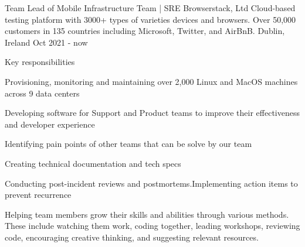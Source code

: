 

\begin{cventries}

    \cventry
    {Team Lead of Mobile Infrastructure Team | SRE} %
    {Browserstack, Ltd} %
    {Cloud-based testing platform with 3000+ types of varieties devices and browsers. Over 50,000 customers in 135 countries including Microsoft, Twitter, and AirBnB.} %
    {Dublin, Ireland} %
    {Oct 2021 - now} %
    {
        \begin{cvitems}{Key responsibilities}
            \item {Provisioning, monitoring and maintaining over 2,000 Linux and MacOS machines across 9 data centers}
            \item {Developing software for Support and Product teams to improve their effectiveness and developer experience}
            \item {Identifying pain points of other teams that can be solve by our team}
            \item {Creating technical documentation and tech specs}
            \item {Conducting post-incident reviews and postmortems.Implementing action items to prevent recurrence}
            \item {Helping team members grow their skills and abilities through various methods. These include watching them work, coding together, leading workshops, reviewing code, encouraging creative thinking, and suggesting relevant resources.}

\end{cvitems}}
\end{cventries}
